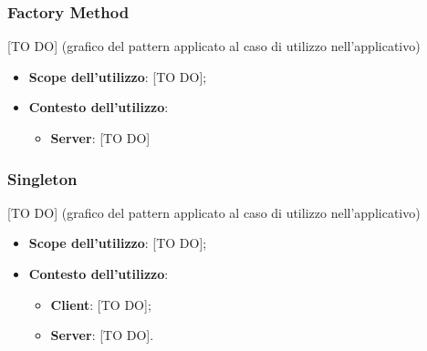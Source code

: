 	\subsubsection{Factory Method} %
	\label{ssub:factory_method}
	[TO DO] (grafico del pattern applicato al caso di utilizzo nell'applicativo)
		\begin{itemize}
			\item \textbf{Scope dell'utilizzo}: [TO DO];
			\item \textbf{Contesto dell'utilizzo}:
				\begin{itemize}
					\item \textbf{Server}: [TO DO] 
				\end{itemize}
		\end{itemize}


	\subsubsection{Singleton} %
	\label{ssub:singleton}
	[TO DO] (grafico del pattern applicato al caso di utilizzo nell'applicativo)
		\begin{itemize}
			\item \textbf{Scope dell'utilizzo}: [TO DO];
			\item \textbf{Contesto dell'utilizzo}:
				\begin{itemize}
					\item \textbf{Client}: [TO DO];
					\item \textbf{Server}: [TO DO].
				\end{itemize}
		\end{itemize}
